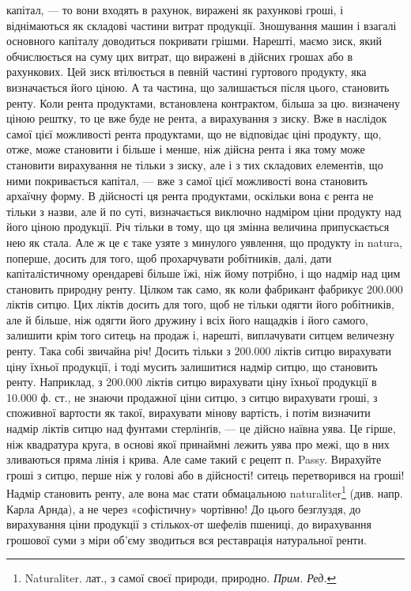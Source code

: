 \parcont{}  %
капітал, — то вони входять в рахунок, виражені як рахункові гроші, і віднімаються
як складові частини витрат продукції. Зношування машин і взагалі
основного капіталу доводиться покривати грішми. Нарешті, маємо зиск, який
обчислюється на суму цих витрат, що виражені в дійсних грошах або в рахункових.
Цей зиск втілюється в певній частині гуртового продукту, яка визначається
його ціною. А та частина, що залишається після цього, становить ренту.
Коли рента продуктами, встановлена контрактом, більша за цю. визначену ціною
рештку, то це вже буде не рента, а вирахування з зиску. Вже в наслідок самої
цієї можливості рента продуктами, що не відповідає ціні продукту, що, отже,
може становити і більше і менше, ніж дійсна рента і яка тому може становити
вирахування не тільки з зиску, але і з тих складових елементів, що ними покривається
капітал, — вже з самої цієї можливості вона становить архаїчну
форму. В дійсності ця рента продуктами, оскільки вона є рента не тільки з
назви, але й по суті, визначається виключно надміром ціни продукту над його
ціною продукції. Річ тільки в тому, що ця змінна величина припускається нею
як стала. Але ж це є таке узяте з минулого уявлення, що продукту in natura,
поперше, досить для того, щоб прохарчувати робітників, далі, дати капіталістичному
орендареві більше їжі, ніж йому потрібно, і що надмір над цим становить
природну ренту. Цілком так само, як коли фабрикант фабрикує \num{200.000}
ліктів ситцю. Цих ліктів досить для того, щоб не тільки одягти його робітників,
але й більше, ніж одягти його дружину і всіх його нащадків і його самого, залишити
крім того ситець на продаж і, нарешті, виплачувати ситцем величезну
ренту. Така собі звичайна річ! Досить тільки з \num{200.000} ліктів ситцю вирахувати
ціну їхньої продукції, і тоді мусить залишитися надмір ситцю, що становить
ренту. Наприклад, з \num{200.000} ліктів ситцю вирахувати ціну їхньої продукції
в \num{10.000} ф. ст., не знаючи продажної ціни ситцю, з ситцю вирахувати
гроші, з споживної вартости як такої, вирахувати мінову вартість, і потім визначити
надмір ліктів ситцю над фунтами стерлінґів, — це дійсно наївна уява.
Це гірше, ніж квадратура круга, в основі якої принаймні лежить уява про
межі, що в них зливаються пряма лінія і крива. Але саме такий є рецепт п.
Passy. Вирахуйте гроші з ситцю, перше ніж у голові або в дійсності! ситець
перетворився на гроші! Надмір становить ренту, але вона має стати обмацальною
naturaliter\footnote*{
Naturaliter. лат., з самої своєї природи, природно. \emph{Прим. Ред.}
} (див. напр. Карла Арнда), а не через «софістичну» чортівню!
До цього безглуздя, до вирахування ціни продукції з стількох-от шефелів пшениці,
до вирахування грошової суми з міри об’єму зводиться вся реставрація
натуральної ренти.

